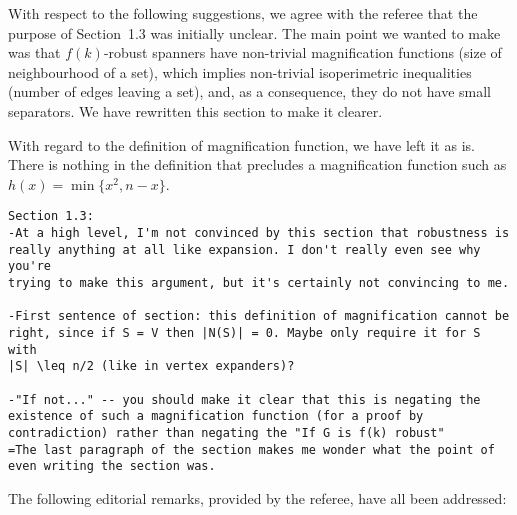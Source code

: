 \documentclass{patmorin}
\begin{document}
With respect to the following suggestions, we agree with the referee
that the purpose of Section~1.3 was initially unclear.  The main point
we wanted to make was that $f(k)$-robust spanners have non-trivial
magnification functions (size of neighbourhood of a set), which implies
non-trivial isoperimetric inequalities (number of edges leaving a set),
and, as a consequence, they do not have small separators.
We have rewritten this section to make it clearer.

With regard to the definition of magnification function, we have left it
as is.  There is nothing in the definition that precludes a magnification
function such as $h(x) = \min\{x^2, n-x\}$.

\begin{Verbatim}[frame=single]
Section 1.3:
-At a high level, I'm not convinced by this section that robustness is
really anything at all like expansion. I don't really even see why you're
trying to make this argument, but it's certainly not convincing to me.

-First sentence of section: this definition of magnification cannot be
right, since if S = V then |N(S)| = 0. Maybe only require it for S with
|S| \leq n/2 (like in vertex expanders)?

-"If not..." -- you should make it clear that this is negating the
existence of such a magnification function (for a proof by
contradiction) rather than negating the "If G is f(k) robust"
=The last paragraph of the section makes me wonder what the point of
even writing the section was.
\end{Verbatim}

The following editorial remarks, provided by the referee, have all been
addressed:
\end{document}
